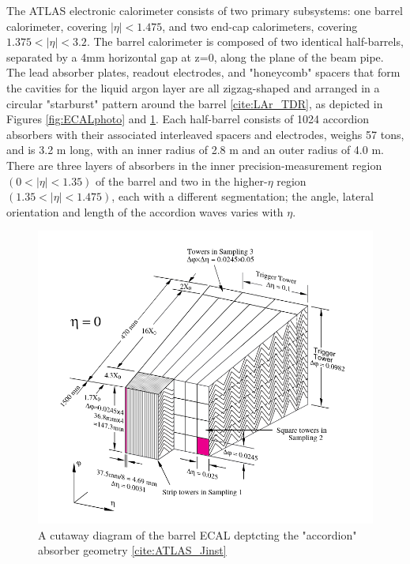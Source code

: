 The ATLAS electronic calorimeter consists of two primary subsystems: one barrel calorimeter, covering $ |\eta |<1.475$, and two end-cap calorimeters, covering $ 1.375<| \eta |< 3.2 $. The barrel calorimeter is composed of two identical half-barrels, separated by a 4mm horizontal gap at z=0, along the plane of the beam pipe. The lead absorber plates, readout electrodes, and "honeycomb" spacers that form the cavities for the liquid argon layer are all zigzag-shaped and arranged in a circular "starburst" pattern around the barrel \ref{cite:LAr_TDR}, as depicted in Figures \ref{fig:ECALphoto} and \ref{fig:ECALdiagram}. Each half-barrel consists of 1024 accordion absorbers with their associated interleaved spacers and electrodes, weighs 57 tons, and is 3.2 m long, with an inner radius of 2.8 m and an outer radius of 4.0 m. There are three layers of absorbers in the inner precision-measurement region $(0 <| \eta |< 1.35)$ of the barrel and two in the higher-$\eta$ region $(1.35 < | \eta |<1.475)$, each with a different segmentation; the angle, lateral orientation and length of the accordion waves varies with $\eta$.

\begin{figure}
  \includegraphics[width=\linewidth]{figures/detector_chapter/ECALdiagram.png}
  \caption{A cutaway diagram of the barrel ECAL deptcting the "accordion" absorber geometry \ref{cite:ATLAS_Jinst}}
  \label{fig:ECALdiagram}
\end{figure}

